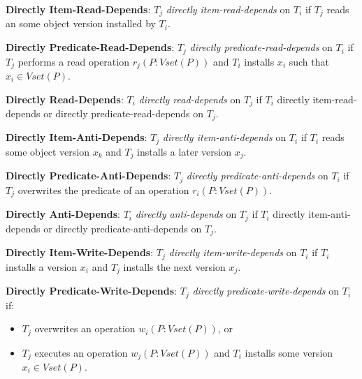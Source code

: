 \begin{definition}
    \textbf{Directly Item-Read-Depends}: $T_j$ \textit{directly item-read-depends} on $T_i$ if $T_j$ reads an some object version installed by $T_i$.
\end{definition}

\begin{definition}
    \textbf{Directly Predicate-Read-Depends}: $T_j$ \textit{directly predicate-read-depends} on $T_i$ if $T_j$ performs a read operation $r_j(P: Vset(P))$ and $T_i$ installs $x_i$ such that $x_i \in Vset(P)$.
\end{definition}

\begin{definition}
    \textbf{Directly Read-Depends}: $T_i$ \textit{directly read-depends} on $T_j$ if $T_i$ directly item-read-depends or directly predicate-read-depends on $T_j$.
\end{definition}

\begin{definition}
    \textbf{Directly Item-Anti-Depends}: $T_j$ \textit{directly item-anti-depends} on $T_i$ if $T_i$ reads some object version $x_k$ and $T_j$ installs a later version $x_j$.
\end{definition}

\begin{definition}
    \textbf{Directly Predicate-Anti-Depends}: $T_j$ \textit{directly predicate-anti-depends} on $T_i$ if $T_j$ overwrites the predicate of an operation $r_i(P: Vset(P))$. %
\end{definition}

\begin{definition}
    \textbf{Directly Anti-Depends}: $T_i$ \textit{directly anti-depends} on $T_j$ if $T_i$ directly item-anti-depends or directly predicate-anti-depends on $T_j$.
\end{definition}

\begin{definition}
    \textbf{Directly Item-Write-Depends}: $T_j$ \textit{directly item-write-depends} on $T_i$ if $T_i$ installs a version $x_i$ and $T_j$ installs the next version $x_j$.
\end{definition}

\begin{definition}
    \textbf{Directly Predicate-Write-Depends}: $T_j$ \textit{directly predicate-write-depends} on $T_i$ if:
    \begin{itemize}
        \item $T_j$ overwrites an operation $w_i(P: Vset(P))$, or
        \item $T_j$ executes an operation $w_j(P: Vset(P))$ and $T_i$ installs some version $x_i \in Vset(P)$.
    \end{itemize}
\end{definition}

